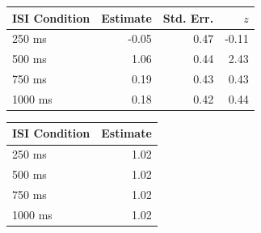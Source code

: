\documentclass[A4paper,man,floatsintext]{apa6}
\theoremstyle{definition}
\theoremstyle{definition}
\theoremstyle{definition}
\theoremstyle{remark}
\begin{document}
\begin{appendix}
\begin{table}[!p]
\begin{subtable}{\textwidth}
\begin{table}[H]
\begin{tabular}{lrrr}
\toprule
ISI Condition & Estimate & Std. Err. & $z$\\
\midrule
250  ms & -0.05 & 0.47 & -0.11\\
500  ms & 1.06 & 0.44 & 2.43\\
750  ms & 0.19 & 0.43 & 0.43\\
1000 ms & 0.18 & 0.42 & 0.44\\
\bottomrule
\end{tabular}\endgroup{}
\end{table}
\end{subtable}
\begin{subtable}{\textwidth}
\caption{Variance Component Estimates. Estimates are presented on the standard deviation scale. }
\centering
\begin{table}[H]\centering\begingroup\fontsize{10}{12}\selectfont

\begin{tabular}{lr}
\toprule
ISI Condition & Estimate\\
\midrule
250 ms & 1.02\\
500 ms & 1.02\\
750 ms & 1.02\\
1000 ms & 1.02\\
\bottomrule
\end{tabular}\endgroup{}
\end{table}
\end{subtable}
\end{table}

\begin{table}


\end{table}
\end{appendix}
\end{document}
